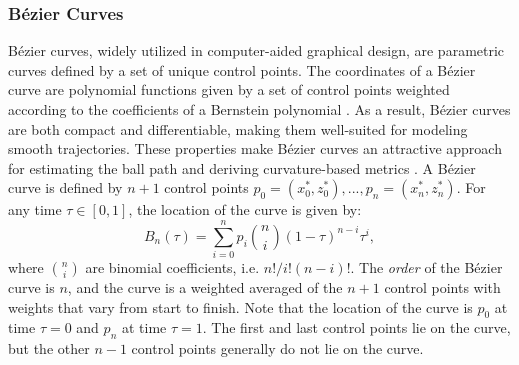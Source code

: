 \documentclass{article}
\begin{document}
        \subsubsection{Bézier Curves}

            Bézier curves, widely utilized in computer-aided graphical design, are parametric curves defined by a set of unique control points. The coordinates of a Bézier curve are polynomial functions given by a set of control points weighted according to the coefficients of a Bernstein polynomial \citep{baydas_defining_2019}. As a result, Bézier curves are both compact and differentiable, making them well-suited for modeling smooth trajectories. These properties make Bézier curves an attractive approach for estimating the ball path and deriving curvature-based metrics \citep{slegers_role_2024}. A Bézier curve is defined by \(n + 1\) control points \(p_0 = (x_0^*, z_0^*), ..., p_n = (x_n^*, z_n^*)\). For any time \(\tau \in [0, 1]\), the location of the curve is given by:
            \begin{equation}
              \label{eqn:bezier}
              B_n(\tau) = \sum_{i=0}^{n} p_i \binom{n}{i} (1 - \tau)^{n-i} \tau^i,
            \end{equation}
            where \( \binom{n}{i} \) are binomial coefficients, i.e. $n! / i! (n - i)!$. The {\it order} of the Bézier curve is \(n\), and the curve is a weighted averaged of the \(n+1\) control points with weights that vary from start to finish. Note that the location of the curve is \(p_0\) at time \(\tau =0\) and \(p_n\) at time \(\tau=1\). The first and last control points lie on the curve, but the other \(n - 1\) control points generally do not lie on the curve.
\end{document}
